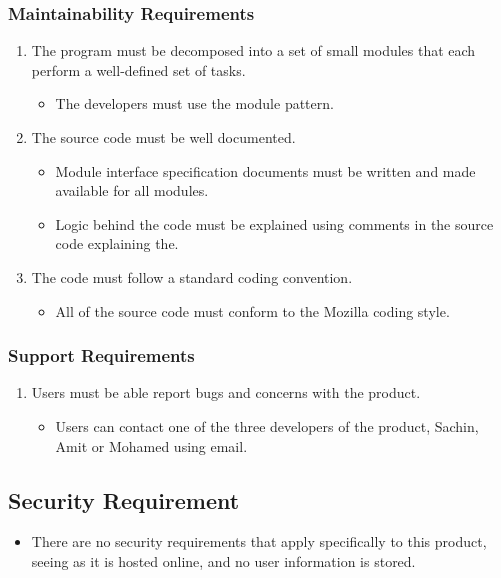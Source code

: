 \documentclass[12pt]{article}
\begin{document}
\subsubsection{Maintainability Requirements}
\begin{enumerate}
    \item The program must be decomposed into a set of small modules that each perform a well-defined set of tasks.
    \begin{itemize}
        \item The developers must use the module pattern.
    \end{itemize}
    \item The source code must be well documented.
    \begin{itemize}
        \item Module interface specification documents must be written and made available for all modules.
        \item Logic behind the code must be explained using comments in the source code explaining the.
    \end{itemize}
    \item The code must follow a standard coding convention.
    \begin{itemize}
        \item All of the source code must conform to the Mozilla coding style.
    \end{itemize}
\end{enumerate}

\subsubsection{Support Requirements}
\begin{enumerate}
    \item Users must be able report bugs and concerns with the product.
    \begin{itemize}
        \item Users can contact one of the three developers of the product, Sachin, Amit or Mohamed using email.
    \end{itemize}
\end{enumerate}

\subsection{Security Requirement}
\begin{itemize}
    \item There are no security requirements that apply specifically to this product, seeing as it is hosted online, and no user information is stored.
\end{itemize}
\end{document}
